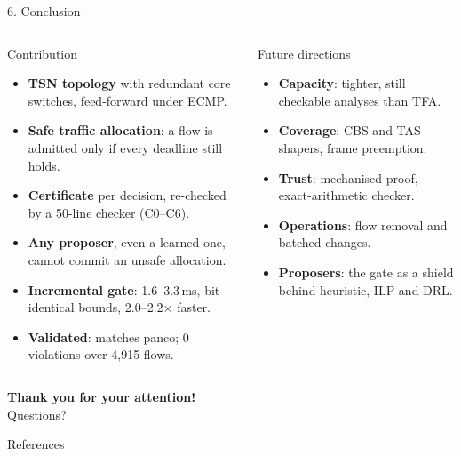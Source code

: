 \documentclass[xcolor=x11names,t,aspectratio=169]{beamer}
\begin{document}
\begin{frame}{6. Conclusion}
\small
\begin{columns}[T,totalwidth=\textwidth]
\begin{block}{Contribution}
\footnotesize\raggedright
\begin{itemize}
  \item \textbf{TSN topology} with redundant core switches, feed-forward under ECMP.
  \item \textbf{Safe traffic allocation}: a flow is admitted only if every deadline still holds.
  \item \textbf{Certificate} per decision, re-checked by a 50-line checker (C0--C6).
  \item \textbf{Any proposer}, even a learned one, cannot commit an unsafe allocation.
  \item \textbf{Incremental gate}: 1.6--3.3\,ms, bit-identical bounds, 2.0--2.2$\times$ faster.
  \item \textbf{Validated}: matches panco; 0 violations over 4,915 flows.
\end{itemize}
\end{block}
\begin{block}{Future directions}
\footnotesize\raggedright
\begin{itemize}
  \item \textbf{Capacity}: tighter, still checkable analyses than TFA.
  \item \textbf{Coverage}: CBS and TAS shapers, frame preemption.
  \item \textbf{Trust}: mechanised proof, exact-arithmetic checker.
  \item \textbf{Operations}: flow removal and batched changes.
  \item \textbf{Proposers}: the gate as a shield behind heuristic, ILP and DRL.
\end{itemize}
\end{block}
\end{columns}
\end{frame}

\begin{frame}[plain]
\vspace{1.6cm}
\begin{center}
{\color{white}\Huge\bfseries Thank you for your attention!}\\[0.6cm]
{\color{softblue}\Large Questions?}
\end{center}
\end{frame}

\appendix

\begin{frame}[allowframebreaks]{References}
\nocite{*}
\scriptsize


\end{frame}
\end{document}
